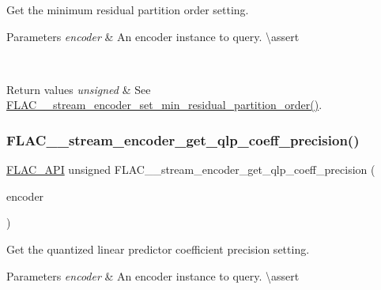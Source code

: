 Get the minimum residual partition order setting.


\begin{DoxyParams}{Parameters}
{\em encoder} & An encoder instance to query. \textbackslash{}assert 
\begin{DoxyCode}{1}
\end{DoxyCode}
 \\
\hline
\end{DoxyParams}

\begin{DoxyRetVals}{Return values}
{\em unsigned} & See \mbox{\hyperlink{group__flac__stream__encoder_gae3e2dd204f276d051bf1a118383bfda2}{F\+L\+A\+C\+\_\+\+\_\+stream\+\_\+encoder\+\_\+set\+\_\+min\+\_\+residual\+\_\+partition\+\_\+order()}}. \\
\hline
\end{DoxyRetVals}
\mbox{\label{group__flac__stream__encoder_ga40ae31529071b3be2f39968d4265c663}} 
\subsubsection{\texorpdfstring{FLAC\_\_stream\_encoder\_get\_qlp\_coeff\_precision()}{FLAC\_\_stream\_encoder\_get\_qlp\_coeff\_precision()}}
{\footnotesize\ttfamily \mbox{\hyperlink{group__flac__export_ga56ca07df8a23310707732b1c0007d6f5}{F\+L\+A\+C\+\_\+\+A\+PI}} unsigned F\+L\+A\+C\+\_\+\+\_\+stream\+\_\+encoder\+\_\+get\+\_\+qlp\+\_\+coeff\+\_\+precision (\begin{DoxyParamCaption}\item[{const \mbox{\hyperlink{struct_f_l_a_c_____stream_encoder}{F\+L\+A\+C\+\_\+\+\_\+\+Stream\+Encoder}} $\ast$}]{encoder }\end{DoxyParamCaption})}

Get the quantized linear predictor coefficient precision setting.


\begin{DoxyParams}{Parameters}
{\em encoder} & An encoder instance to query. \textbackslash{}assert 
\begin{DoxyCode}{1}
\end{DoxyCode}
 \\
\hline
\end{DoxyParams}

